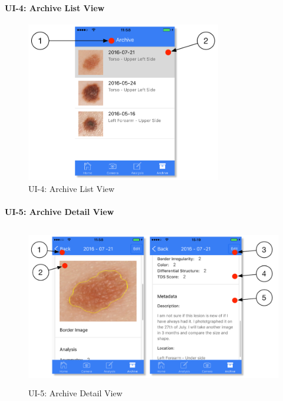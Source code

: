             \paragraph{UI-4: Archive List View}

                \begin{figure}[H]
                    \centering
                    \includegraphics[height=7cm]{assets/GUI/ARCHIVE_01.pdf}
                    \caption{UI-4: Archive List View}
                    \label{fig:ui-4}
                \end{figure}

            \paragraph{UI-5: Archive Detail View}

                \begin{figure}[H]
                    \centering
                    \includegraphics[height=7cm]{assets/GUI/ARCHIVE_02.pdf}
                    \caption{UI-5: Archive Detail View}
                    \label{fig:ui-5}
                \end{figure}


